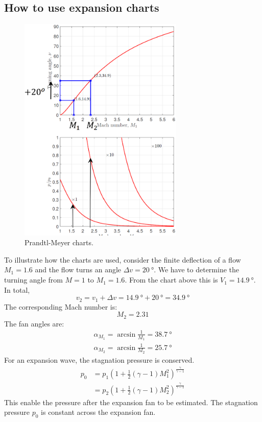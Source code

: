 \subsection{How to use expansion charts}
\begin{figure}[H]
    \centering
    \includegraphics[width = 0.7\textwidth]{./img/diagram26.png}
    \caption{Prandtl-Meyer charts.}
\end{figure}
To illustrate how the charts are used, consider the finite deflection of a flow $M_1 = 1.6$ and the flow turns an angle $\Delta v = \SI{20}{\degree}$. We have to determine the turning angle from $M= 1$ to $M_1 = 1.6$. From the chart above this is $V_1 = \SI{14.9}{\degree}$. In total,
\begin{equation}
    v_2 = v_1 + \Delta v = \SI{14.9}{\degree} + \SI{20}{\degree} = \SI{34.9}{\degree}
\end{equation}
The corresponding Mach number is:
\begin{equation}
    M_2 = 2.31
\end{equation}
The fan angles are:
\begin{align}
    \alpha_{M_1} = \arcsin \frac{1}{M_1} = \SI{38.7}{\degree} \\
    \alpha_{M_2} = \arcsin \frac{1}{M_2} = \SI{25.7}{\degree}
\end{align}
For an expansion wave, the stagnation pressure is conserved.
\begin{align}
    p_0 & = p_1 \left(1 + \frac{1}{2}\left(\gamma - 1\right)M^2_1\right)^{\frac{\gamma}{\gamma -1}}  \\
        & = p_2 \left(1 + \frac{1}{2}\left(\gamma - 1\right)M^2_2\right)^{\frac{\gamma}{\gamma - 1}}
\end{align}
This enable the pressure after the expansion fan to be estimated. The stagnation pressure $p_0$ is constant across the expansion fan.
